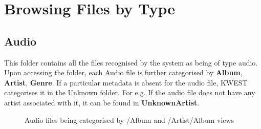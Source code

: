 \section*{Browsing Files by Type}

\subsection{Audio}
This folder contains all the files recognised by the system as being of type audio. Upon accessing the folder, each Audio file is further categorised by \textbf{Album}, \textbf{Artist}, \textbf{Genre}. If a particular metadata is absent for the audio file, KWEST categorises it in the Unknown folder. \newline
For e.g. If the audio file does not have any artist associated with it, it can be found in \textbf{UnknownArtist}.
\begin{figure}[htb]
\centering
\setlength\fboxsep{0pt}
\setlength\fboxrule{0.5pt}
\caption{Audio files being categorised by /Album and /Artist/Album views}
\label{fig:dfd0}
\end{figure}

